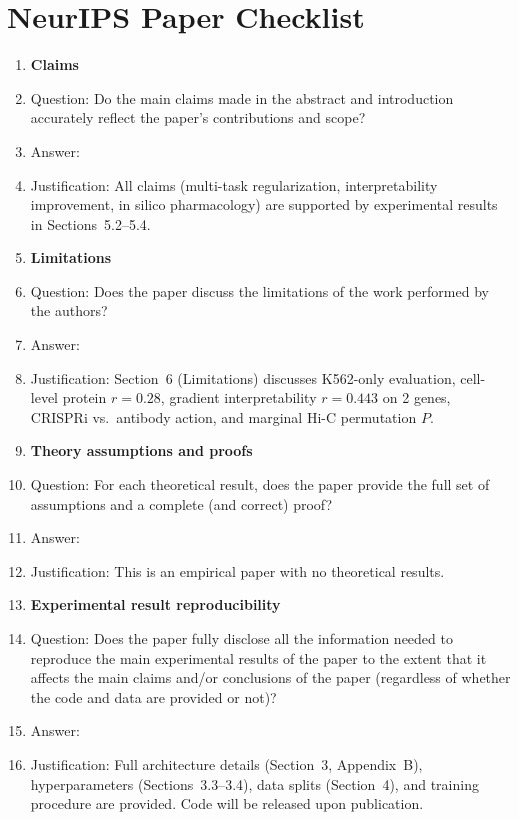 \documentclass{article}
\begin{document}
\section*{NeurIPS Paper Checklist}

\begin{enumerate}

\item {\bf Claims}
    \item[] Question: Do the main claims made in the abstract and introduction accurately reflect the paper's contributions and scope?
    \item[] Answer: \answerYes{}
    \item[] Justification: All claims (multi-task regularization, interpretability improvement, in silico pharmacology) are supported by experimental results in Sections~5.2--5.4.

\item {\bf Limitations}
    \item[] Question: Does the paper discuss the limitations of the work performed by the authors?
    \item[] Answer: \answerYes{}
    \item[] Justification: Section~6 (Limitations) discusses K562-only evaluation, cell-level protein $r = 0.28$, gradient interpretability $r = 0.443$ on 2 genes, CRISPRi vs.\ antibody action, and marginal Hi-C permutation $P$.

\item {\bf Theory assumptions and proofs}
    \item[] Question: For each theoretical result, does the paper provide the full set of assumptions and a complete (and correct) proof?
    \item[] Answer: \answerNA{}
    \item[] Justification: This is an empirical paper with no theoretical results.

\item {\bf Experimental result reproducibility}
    \item[] Question: Does the paper fully disclose all the information needed to reproduce the main experimental results of the paper to the extent that it affects the main claims and/or conclusions of the paper (regardless of whether the code and data are provided or not)?
    \item[] Answer: \answerYes{}
    \item[] Justification: Full architecture details (Section~3, Appendix~B), hyperparameters (Sections~3.3--3.4), data splits (Section~4), and training procedure are provided. Code will be released upon publication.


\end{enumerate}
\end{document}

